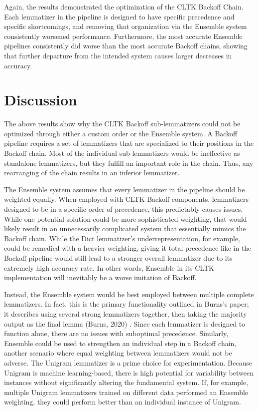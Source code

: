 \documentclass[11pt]{article}
\begin{document}
Again, the results demonstrated the optimization of the CLTK Backoff Chain. Each lemmatizer in the pipeline is designed to have specific precedence and specific shortcomings, and removing that organization via the Ensemble system consistently worsened performance. Furthermore, the most accurate Ensemble pipelines consistently did worse than the most accurate Backoff chains, showing that further departure from the intended system causes larger decreases in accuracy.

\section{Discussion}

The above results show why the CLTK Backoff sub-lemmatizers could not be optimized through either a custom order or the Ensemble system. A Backoff pipeline requires a set of lemmatizers that are specialized to their positions in the Backoff chain. Most of the individual sub-lemmatizers would be ineffective as standalone lemmatizers, but they fulfill an important role in the chain. Thus, any rearranging of the chain results in an inferior lemmatizer. 

The Ensemble system assumes that every lemmatizer in the pipeline should be weighted equally. When employed with CLTK Backoff components, lemmatizers designed to be in a specific order of precedence, this predictably causes issues. While one potential solution could be more sophisticated weighting, that would likely result in an unnecessarily complicated system that essentially mimics the Backoff chain. While the Dict lemmatizer’s underrepresentation, for example, could be remedied with a heavier weighting, giving it total precedence like in the Backoff pipeline would still lead to a stronger overall lemmatizer due to its extremely high accuracy rate. In other words, Ensemble in its CLTK implementation will inevitably be a worse imitation of Backoff.

Instead, the Ensemble system would be best employed between multiple complete lemmatizers. In fact, this is the primary functionality outlined in Burns’s paper; it describes using several strong lemmatizers together, then taking the majority output as the final lemma (Burns, 2020) \cite{ensemble}. Since each lemmatizer is designed to function alone, there are no issues with suboptimal precedence. Similarly, Ensemble could be used to strengthen an individual step in a Backoff chain, another scenario where equal weighting between lemmatizers would not be adverse. The Unigram lemmatizer is a prime choice for experimentation. Because Unigram is machine learning-based, there is high potential for variability between instances without significantly altering the fundamental system. If, for example, multiple Unigram lemmatizers trained on different data performed an Ensemble weighting, they could perform better than an individual instance of Unigram.
\end{document}

